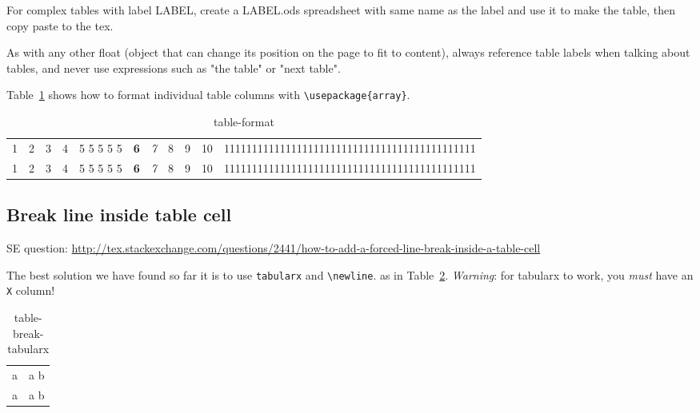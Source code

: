 \documentclass[12pt]{article}
\begin{document}
  For complex tables with label LABEL, create a LABEL.ods spreadsheet with same name as the label and use it to make the table, then copy paste to the tex.

  As with any other float (object that can change its position on the page to fit to content), always reference table labels when talking about tables, and never use expressions such as "the table" or "next table".

  Table~\ref{table-format} shows how to format individual table columns with \lstinline|\usepackage{array}|.

  \begin{table}[!htpb]
    \begin{tabular}{l c rp{1cm} p{1cm} >{\bf}c >{\it}c | c || c @{abc} c c}
      1 & 2 & 3 & 4 & 5 5 5 5 5 & 6 & 7 & 8 & 9 & 10 & 111111111111111111111111111111111111111111111 \\
      1 & 2 & 3 & 4 & 5 5 5 5 5 & 6 & 7 & 8 & 9 & 10 & 111111111111111111111111111111111111111111111 \\
    \end{tabular}
    \caption{table-format}
    \label{table-format}
  \end{table}

  \subsection{Break line inside table cell}\label{break-line-inside-table-cell}

    SE question: \url{http://tex.stackexchange.com/questions/2441/how-to-add-a-forced-line-break-inside-a-table-cell}

    The best solution we have found so far it is to use \lstinline|tabularx| and \lstinline|\newline|.
    as in Table~\ref{table-break-tabularx}. \emph{Warning}: for tabularx to work, you \emph{must}
    have an \lstinline|X| column!

    \begin{table}[!htpb]
      \begin{tabularx}{\textwidth}{lX}
          a & a \newline
              b \\
          a & a \newline
              b \\
      \end{tabularx}
      \caption{table-break-tabularx}
      \label{table-break-tabularx}
    \end{table}
\end{document}
